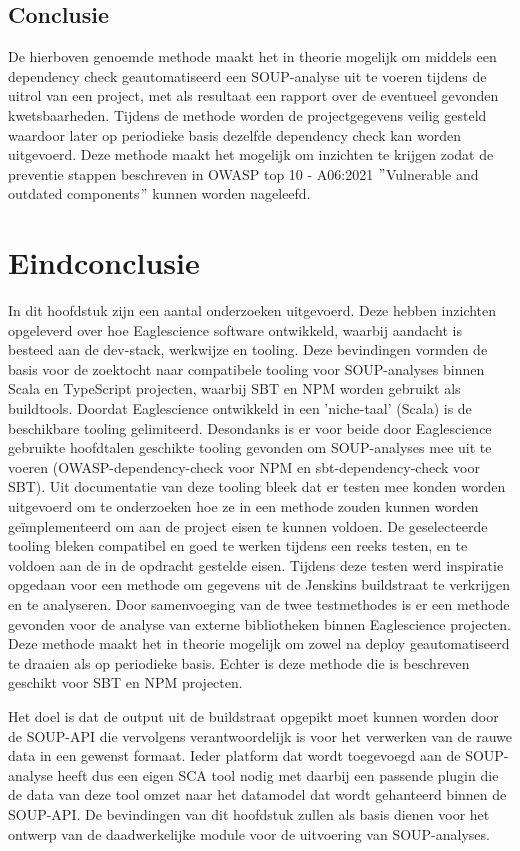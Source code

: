 \subsection{Conclusie}\label{subsec:conclusie}
De hierboven genoemde methode maakt het in theorie mogelijk om middels een dependency check geautomatiseerd een SOUP-analyse uit te voeren tijdens de uitrol van een project, met als resultaat een rapport over de eventueel gevonden kwetsbaarheden. Tijdens de methode worden de projectgegevens veilig gesteld waardoor later op periodieke basis dezelfde dependency check kan worden uitgevoerd.
Deze methode maakt het mogelijk om inzichten te krijgen zodat de preventie stappen beschreven in OWASP top 10 - A06:2021 $"$Vulnerable and outdated components$"$ kunnen worden nageleefd.


\section{Eindconclusie}\label{sec:Eindconclusie}
In dit hoofdstuk zijn een aantal onderzoeken uitgevoerd. Deze hebben inzichten opgeleverd over hoe Eaglescience software ontwikkeld, waarbij aandacht is besteed aan de dev-stack, werkwijze en tooling. Deze bevindingen vormden de basis voor de zoektocht naar compatibele tooling voor SOUP-analyses binnen Scala en TypeScript projecten, waarbij SBT en NPM worden gebruikt als buildtools. Doordat Eaglescience ontwikkeld in een 'niche-taal' (Scala) is de beschikbare tooling gelimiteerd. Desondanks is er voor beide door Eaglescience gebruikte hoofdtalen geschikte tooling gevonden om SOUP-analyses mee uit te voeren (OWASP-dependency-check voor NPM en sbt-dependency-check voor SBT). Uit documentatie van deze tooling bleek dat er testen mee konden worden uitgevoerd om te onderzoeken hoe ze in een methode zouden kunnen worden geïmplementeerd om aan de project eisen te kunnen voldoen. De geselecteerde tooling bleken compatibel en goed te werken tijdens een reeks testen, en te voldoen aan de in de opdracht gestelde eisen. Tijdens deze testen werd inspiratie opgedaan voor een methode om gegevens uit de Jenskins buildstraat te verkrijgen en te analyseren. Door samenvoeging van de twee testmethodes is er een methode gevonden voor de analyse van externe bibliotheken binnen Eaglescience projecten. Deze methode maakt het in theorie mogelijk om zowel na deploy geautomatiseerd te draaien als op periodieke basis. Echter is deze methode die is beschreven geschikt voor SBT en NPM projecten.

Het doel is dat de output uit de buildstraat opgepikt moet kunnen worden door de SOUP-API die vervolgens verantwoordelijk is voor het verwerken van de rauwe data in een gewenst formaat. Ieder platform dat wordt toegevoegd aan de SOUP-analyse heeft dus een eigen SCA tool nodig met daarbij een passende plugin die de data van deze tool omzet naar het datamodel dat wordt gehanteerd binnen de SOUP-API. De bevindingen van dit hoofdstuk zullen als basis dienen voor het ontwerp van de daadwerkelijke module voor de uitvoering van SOUP-analyses.
